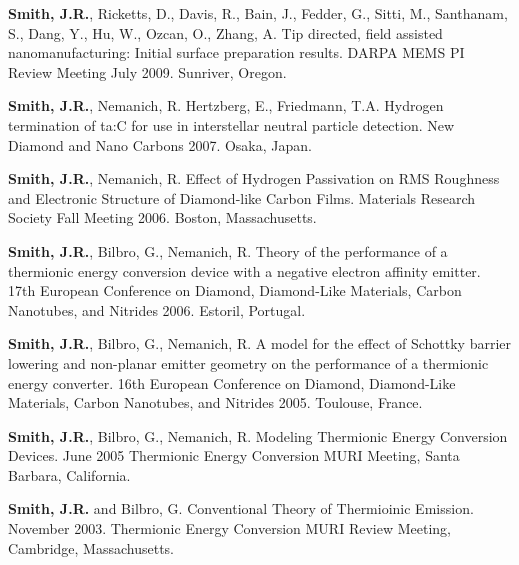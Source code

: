 \textbf{Smith, J.R.}, Ricketts, D., Davis, R., Bain, J., Fedder, G.,
Sitti, M., Santhanam, S., Dang, Y., Hu, W., Ozcan, O., Zhang, A. Tip
directed, field assisted nanomanufacturing: Initial surface preparation
results. DARPA MEMS PI Review Meeting July 2009. Sunriver, Oregon.

\textbf{Smith, J.R.}, Nemanich, R. Hertzberg, E., Friedmann, T.A.
Hydrogen termination of ta:C for use in interstellar neutral particle
detection. New Diamond and Nano Carbons 2007. Osaka, Japan.

\textbf{Smith, J.R.}, Nemanich, R. Effect of Hydrogen Passivation on RMS
Roughness and Electronic Structure of Diamond-like Carbon Films.
Materials Research Society Fall Meeting 2006. Boston, Massachusetts.

\textbf{Smith, J.R.}, Bilbro, G., Nemanich, R. Theory of the performance
of a thermionic energy conversion device with a negative electron
affinity emitter. 17th European Conference on Diamond, Diamond-Like
Materials, Carbon Nanotubes, and Nitrides 2006. Estoril, Portugal.

\textbf{Smith, J.R.}, Bilbro, G., Nemanich, R. A model for the effect of
Schottky barrier lowering and non-planar emitter geometry on the
performance of a thermionic energy converter. 16th European Conference
on Diamond, Diamond-Like Materials, Carbon Nanotubes, and Nitrides 2005.
Toulouse, France.

\textbf{Smith, J.R.}, Bilbro, G., Nemanich, R. Modeling Thermionic
Energy Conversion Devices. June 2005 Thermionic Energy Conversion MURI
Meeting, Santa Barbara, California.

\textbf{Smith, J.R.} and Bilbro, G. Conventional Theory of Thermioinic
Emission. November 2003. Thermionic Energy Conversion MURI Review
Meeting, Cambridge, Massachusetts.

